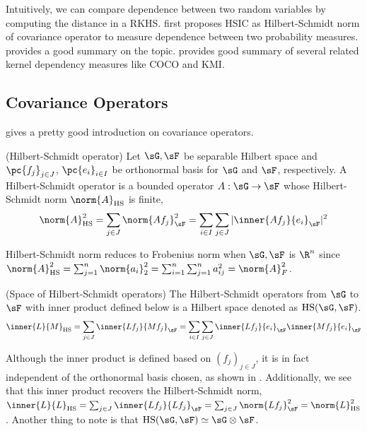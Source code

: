 \documentclass[11pt]{article}
\begin{document}
Intuitively, we can compare dependence between two random variables by computing the distance in a RKHS. \cite{grettonMeasuringStatisticalDependence2005} first proposes HSIC as Hilbert-Schmidt norm of covariance operator to measure dependence between two probability measures. \cite{muandetKernelMeanEmbedding2017} provides a good summary on the topic. \cite{grettonKernelMethodsMeasuring2005} provides good summary of several related kernel dependency measures like COCO and KMI. 

\subsection{Covariance Operators}

\cite{grettonNotesMeanEmbeddings2019} gives a pretty good introduction on covariance operators.

\begin{definition}
    (Hilbert-Schmidt operator) Let $\sG,\sF$ be separable Hilbert space and $\pc{f_j}_{j\in J}$, $\pc{e_i}_{i\in I}$ be orthonormal basis for $\sG$ and $\sF$, respectively. A Hilbert-Schmidt operator is a bounded operator $A:\sG\to\sF$ whose Hilbert-Schmidt norm $\norm{A}_{\text{HS}}$ is finite, 
    \begin{align}
        \norm{A}_{\text{HS}}^2 
            = \sum_{j\in J} \norm{A f_j}_{\sF}^2 
            = \sum_{i\in I}\sum_{j\in J} |\inner{A f_j}{e_i}_{\sF}|^2
    \end{align}
\end{definition}

Hilbert-Schmidt norm reduces to Frobenius norm when $\sG,\sF$ is $\R^n$ since $\norm{A}_{\text{HS}}^2 = \sum_{j=1}^n \norm{a_i}_2^2 = \sum_{i=1}^n \sum_{j=1}^n a_{ij}^2 = \norm{A}_{F}^2$. 
\begin{definition}
    (Space of Hilbert-Schmidt operators) The Hilbert-Schmidt operators from $\sG$ to $\sF$ with inner product defined below is a Hilbert space denoted as $\text{HS}(\sG,\sF)$.
    \begin{align}
        \inner{L}{M}_{\text{HS}} 
            = \sum_{j\in J} \inner{Lf_j}{Mf_j}_{\sF}
            = \sum_{i\in I}\sum_{j\in J} \inner{Lf_j}{e_i}_{\sF} \inner{Mf_j}{e_i}_{\sF}
    \end{align}
\end{definition}

Although the inner product is defined based on $(f_j)_{j\in J}$, it is in fact independent of the orthonormal basis chosen, as shown in \cite{grettonNotesMeanEmbeddings2019}. Additionally, we see that this inner product recovers the Hilbert-Schmidt norm, $\inner{L}{L}_{\text{HS}} = \sum_{j\in J} \inner{Lf_j}{Lf_j}_{\sF} = \sum_{j\in J} \norm{L f_j}_{\sF}^2 = \norm{L}_{\text{HS}}^2$. Another thing to note is that $\text{HS}(\sG,\sF) \simeq \sG\otimes \sF$.
\end{document}
